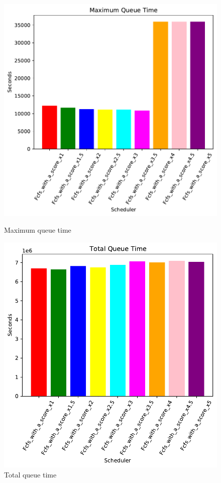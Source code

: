 \documentclass[a4paper]{article}
\begin{document}
	\begin{figure}[H]\begin{minipage}[b]{0.5\linewidth}\centering\includegraphics[width=1\linewidth]{MBSS/plot/FCFS_Score_2022-03-16->2022-03-20_Maximum_queue_time_450_128_32_256_4_1024.pdf}\caption{Maximum queue time}\vspace{4ex}\end{minipage}%
	\begin{minipage}[b]{0.5\linewidth}\centering\includegraphics[width=1\linewidth]{MBSS/plot/FCFS_Score_2022-03-16->2022-03-20_Total_queue_time_450_128_32_256_4_1024.pdf}\caption{Total queue time}\vspace{4ex}\end{minipage}

\end{figure}
\end{document}
